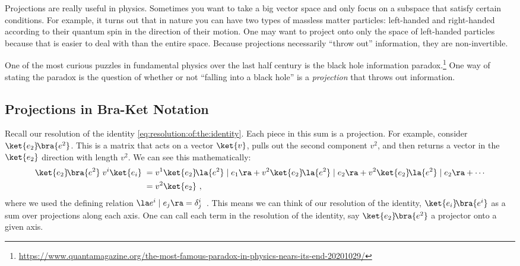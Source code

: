 Projections are really useful in physics. Sometimes you want to take a big vector space and only focus on a subspace that satisfy certain conditions. For example, it turns out that in nature you can have two types of massless matter particles: left-handed and right-handed according to their quantum spin in the direction of their motion. One may want to project onto only the space of left-handed particles because that is easier to deal with than the entire space. Because projections necessarily ``throw out'' information, they are non-invertible.

\begin{example}
One of the most curious puzzles in fundamental physics over the last half century is the black hole information paradox.\footnote{\url{https://www.quantamagazine.org/the-most-famous-paradox-in-physics-nears-its-end-20201029/}} One way of stating the paradox is the question of whether or not ``falling into a black hole'' is a \emph{projection} that throws out information. 
\end{example}

\subsection{Projections in Bra-Ket Notation}
Recall our resolution of the identity \eqref{eq:resolution:of:the:identity}. Each piece in this sum is a projection. For example, consider $\ket{e_2}\!\bra{e^2}$. This is a matrix that acts on a vector $\ket{v}$, pulls out the second component $v^2$, and then returns a vector in the $\ket{e_2}$ direction with length $v^2$. We can see this mathematically:
\begin{align}
    \ket{e_2}\!\bra{e^2} \; v^i\ket{e_i} \;
    &= 
    v^1\ket{e_2}\!\la{e^2}\mid {e_1}\ra + 
    v^2\ket{e_2}\!\la{e^2}\mid {e_2}\ra +
    v^2\ket{e_2}\!\la{e^2}\mid {e_2}\ra + \cdots
    \\ 
    &= v^2 \ket{e_2} \ ,
    \label{eq:projection:e2:e2}
\end{align}
where we used the defining relation $\la e^i \mid e_j \ra = \delta^i_j$\ . This means we can think of our resolution of the identity, $\ket{e_i}\!\bra{e^i}$ as a sum over projections along each axis. One can call each term in the resolution of the identity, say $\ket{e_2}\!\bra{e^2}$ a projector onto a given axis.

